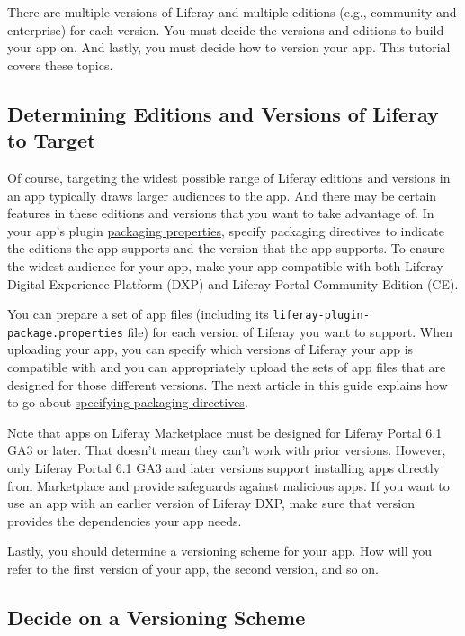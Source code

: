 There are multiple versions of Liferay and multiple editions (e.g.,
community and enterprise) for each version. You must decide the versions
and editions to build your app on. And lastly, you must decide how to
version your app. This tutorial covers these topics.

\subsection{Determining Editions and Versions of Liferay to
Target}\label{determining-editions-and-versions-of-liferay-to-target}

Of course, targeting the widest possible range of Liferay editions and
versions in an app typically draws larger audiences to the app. And
there may be certain features in these editions and versions that you
want to take advantage of. In your app's plugin
\href{/how-to-publish/-/knowledge_base/publish/preparing-your-app}{packaging
properties}, specify packaging directives to indicate the editions the
app supports and the version that the app supports. To ensure the widest
audience for your app, make your app compatible with both Liferay
Digital Experience Platform (DXP) and Liferay Portal Community Edition
(CE).

You can prepare a set of app files (including its
\texttt{liferay-plugin-package.properties} file) for each version of
Liferay you want to support. When uploading your app, you can specify
which versions of Liferay your app is compatible with and you can
appropriately upload the sets of app files that are designed for those
different versions. The next article in this guide explains how to go
about
\href{/how-to-publish/-/knowledge_base/publish/preparing-your-app}{specifying
packaging directives}.

Note that apps on Liferay Marketplace must be designed for Liferay
Portal 6.1 GA3 or later. That doesn't mean they can't work with prior
versions. However, only Liferay Portal 6.1 GA3 and later versions
support installing apps directly from Marketplace and provide safeguards
against malicious apps. If you want to use an app with an earlier
version of Liferay DXP, make sure that version provides the dependencies
your app needs.

Lastly, you should determine a versioning scheme for your app. How will
you refer to the first version of your app, the second version, and so
on.

\subsection{Decide on a Versioning
Scheme}\label{decide-on-a-versioning-scheme}

